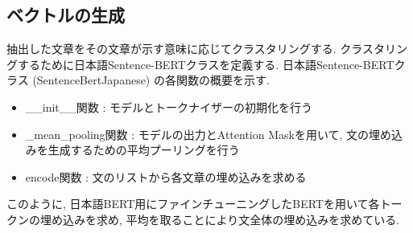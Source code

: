 \subsection{ベクトルの生成}
抽出した文章をその文章が示す意味に応じてクラスタリングする. クラスタリングするために日本語Sentence-BERTクラスを定義する. 日本語Sentence-BERTクラス (SentenceBertJapanese) の各関数の概要を示す. 
\begin{itemize}
  \item \_\_init\_\_関数 : モデルとトークナイザーの初期化を行う
  \item \_mean\_pooling関数 : モデルの出力とAttention Maskを用いて, 文の埋め込みを生成するための平均プーリングを行う
  \item encode関数 : 文のリストから各文章の埋め込みを求める
\end{itemize}

このように, 日本語BERT用にファインチューニングしたBERTを用いて各トークンの埋め込みを求め, 平均を取ることにより文全体の埋め込みを求めている. 






